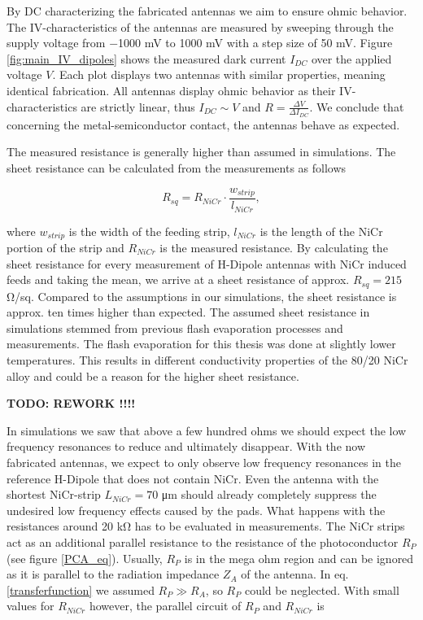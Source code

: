 By DC characterizing the fabricated antennas we aim to ensure ohmic behavior. The IV-characteristics of the antennas are measured by sweeping through the supply voltage from \num{-1000} \si{\milli \volt} to \num{1000} \si{\milli \volt} with a step size of \num{50} \si{\milli \volt}. Figure \ref{fig:main_IV_dipoles} shows the measured dark current $I_{DC}$ over the applied voltage $V$. Each plot displays two antennas with similar properties, meaning identical fabrication. All antennas display ohmic behavior as their IV-characteristics are strictly linear, thus $I_{DC} \sim V$ and $R = \frac{\Delta V}{\Delta I_{DC}}$. We conclude that concerning the metal-semiconductor contact, the antennas behave as expected.  

The measured resistance is generally higher than assumed in simulations. The sheet resistance can be calculated from the measurements as follows

\begin{equation}
    R_{sq} = R_{NiCr}\cdot\frac{w_{strip}}{l_{NiCr}},
\end{equation}

where $w_{strip}$ is the width of the feeding strip, $l_{NiCr}$ is the length of the NiCr portion of the strip and $R_{NiCr}$ is the measured resistance. By calculating the sheet resistance for every measurement of H-Dipole antennas with NiCr induced feeds and taking the mean, we arrive at a sheet resistance of approx. $R_{sq} = 215$ \si{\ohm/sq}. Compared to the assumptions in our simulations, the sheet resistance is approx. ten times higher than expected. The assumed sheet resistance in simulations stemmed from previous flash evaporation processes and measurements. The flash evaporation for this thesis was done at slightly lower temperatures. This results in different conductivity properties of the \num{80}/\num{20} NiCr alloy and could be a reason for the higher sheet resistance.

\textbf{TODO: REWORK !!!!}


In simulations we saw that above a few hundred ohms we should expect the low frequency resonances to reduce and ultimately disappear. With the now fabricated antennas, we expect to only observe low frequency resonances in the reference H-Dipole that does not contain NiCr. Even the antenna with the shortest NiCr-strip $L_{NiCr} = 70$ \si{\micro \meter} should already completely suppress the undesired low frequency effects caused by the pads. What happens with the resistances around \num{20} \si{\kilo \ohm} has to be evaluated in measurements. The NiCr strips act as an additional parallel resistance to the resistance of the photoconductor $R_P$ (see figure \ref{PCA_eq}). Usually, $R_P$ is in the mega ohm region and can be ignored as it is parallel to the radiation impedance $Z_A$ of the antenna. In eq. \ref{transferfunction} we assumed $R_P \gg R_A$, so $R_P$ could be neglected. With small values for $R_{NiCr}$ however, the parallel circuit of $R_P$ and $R_{NiCr}$ is

